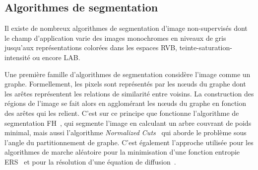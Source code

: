\subsection{Algorithmes de segmentation}
\label{sec:segmentations}

Il existe de nombreux algorithmes de segmentation d'image non-supervisés dont le champ d'application varie des images monochromes en niveaux de gris jusqu'aux représentations colorées dans les espaces \gls{RVB}, teinte-saturation-intensité ou encore \gls{LAB}.

Une première famille d'algorithmes de segmentation considère l'image comme un graphe. Formellement, les pixels sont représentés par les n\oe{}uds du graphe dont les arêtes représentent les relations de similarité entre voisins. La construction des régions de l'image se fait alors en agglomérant les nœuds du graphe en fonction des arêtes qui les relient. C'est sur ce principe que fonctionne l'algorithme de segmentation \gls{FH}~\cite{felzenszwalb_efficient_2004}, qui segmente l'image en calculant un arbre couvrant de poids minimal, mais aussi l'algorithme \emph{Normalized Cuts}~\cite{shi_normalized_2000} qui aborde le problème sous l'angle du partitionnement de graphe. C'est également l'approche utilisée pour les algorithmes de marche aléatoire pour la minimisation d'une fonction entropie \gls{ERS}~\cite{liu_entropy_2011} et pour la résolution d'une équation de diffusion~\cite{grady_random_2006}.


